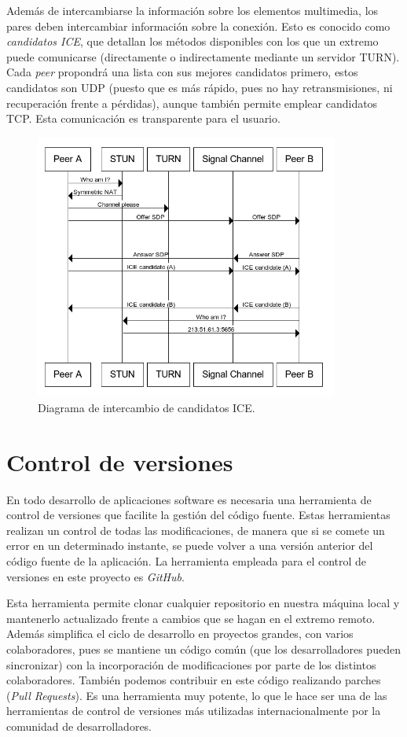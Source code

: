 \documentclass[a4paper, 12pt]{book}
\begin{document}
Además de intercambiarse la información sobre los elementos multimedia, los pares deben intercambiar información sobre la conexión. Esto es conocido como \textit{candidatos ICE}, que detallan los métodos disponibles con los que un extremo puede comunicarse (directamente o indirectamente mediante un servidor TURN). Cada \textit{peer} propondrá una lista con sus mejores candidatos primero, estos candidatos son UDP (puesto que es más rápido, pues no hay retransmisiones, ni recuperación frente a pérdidas), aunque también permite emplear candidatos TCP. Esta comunicación es transparente para el usuario.

\begin{figure}[H]
	\centering
    \includegraphics[width=10cm]{img/ice_diagram.png}
    \caption{Diagrama de intercambio de candidatos ICE.}
\end{figure}

\section{Control de versiones}
\label{sec:control-de-versiones}

En todo desarrollo de aplicaciones software es necesaria una herramienta de control de versiones que facilite la gestión del código fuente. Estas herramientas realizan un control de todas las modificaciones, de manera que si se comete un error en un determinado instante, se puede volver a una versión anterior del código fuente de la aplicación. La herramienta empleada para el control de versiones en este proyecto es \emph{GitHub}.

Esta herramienta permite clonar cualquier repositorio en nuestra máquina local y mantenerlo actualizado frente a cambios que se hagan en el extremo remoto. Además simplifica el ciclo de desarrollo en proyectos grandes, con varios colaboradores, pues se mantiene un código común (que los desarrolladores pueden sincronizar) con la incorporación de modificaciones por parte de los distintos colaboradores. También podemos contribuir en este código realizando parches (\emph{Pull Requests}). Es una herramienta muy potente, lo que le hace ser una de las herramientas de control de versiones más utilizadas internacionalmente por la comunidad de desarrolladores.
\end{document}

